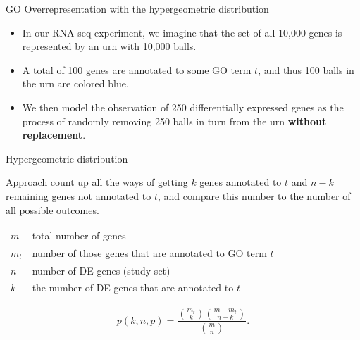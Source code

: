 \documentclass{beamer}
\begin{document}

\begin{frame}{GO Overrepresentation with the hypergeometric distribution}
\begin{itemize}
\item In our
RNA-seq experiment, we imagine that the set of all 10,000 genes is represented by an urn with 10,000 balls.
\item  A total of 100 genes are
annotated to some GO term $t$, and thus 100 balls in the urn are
colored blue.
\item We then model the observation of 250 differentially
expressed genes as the process of randomly removing 250 balls in turn
from the urn {\bf without replacement}. 
\end{itemize}
   
\end{frame}


\begin{frame}{Hypergeometric distribution}
\begin{mybluebox}{Approach}
count up all the ways of getting $k$ genes annotated to $t$ and $n-k$
remaining genes not annotated to $t$, and compare this number to the
number of all possible outcomes. 
\end{mybluebox}

\begin{tabular}{ll}
$m$ & total number of genes\\
$m_t$ & number of those genes that are annotated to GO term $t$\\
$n$ & number of DE genes (study set) \\
$k$& the number of DE genes that are annotated to $t$\\
\end{tabular}

\vspace{4mm}

\begin{equation}
 \label{eq:hypergeometric}
p(k,n,p)  = \dfrac{\binom{m_t}{k}\binom{m-m_t}{n-k}}{\binom{m}{n}}.
\end{equation}
\end{frame}
\end{document}
